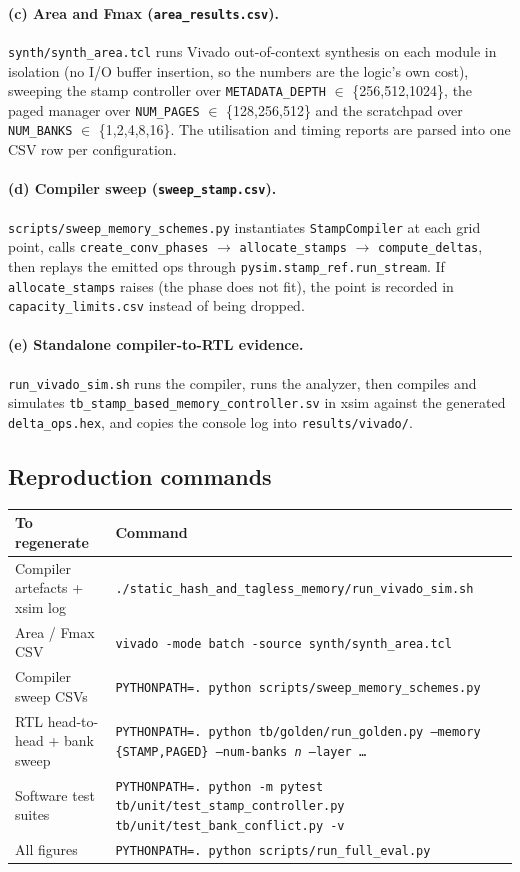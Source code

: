 \documentclass[11pt,a4paper]{article}
\newcommand{\file}[1]{\texttt{\small #1}}
\begin{document}
\paragraph{(c) Area and Fmax (\file{area\_results.csv}).}
\file{synth/synth\_area.tcl} runs Vivado out-of-context synthesis on each module
in isolation (no I/O buffer insertion, so the numbers are the logic's own cost),
sweeping the stamp controller over \file{METADATA\_DEPTH} $\in$ \{256,512,1024\},
the paged manager over \file{NUM\_PAGES} $\in$ \{128,256,512\} and the
scratchpad over \file{NUM\_BANKS} $\in$ \{1,2,4,8,16\}. The utilisation and
timing reports are parsed into one CSV row per configuration.

\paragraph{(d) Compiler sweep (\file{sweep\_stamp.csv}).}
\file{scripts/sweep\_memory\_schemes.py} instantiates \file{StampCompiler} at
each grid point, calls \file{create\_conv\_phases} $\to$
\file{allocate\_stamps} $\to$ \file{compute\_deltas}, then replays the emitted
ops through \file{pysim.stamp\_ref.run\_stream}. If \file{allocate\_stamps}
raises (the phase does not fit), the point is recorded in
\file{capacity\_limits.csv} instead of being dropped.

\paragraph{(e) Standalone compiler-to-RTL evidence.}
\file{run\_vivado\_sim.sh} runs the compiler, runs the analyzer, then compiles
and simulates \file{tb\_stamp\_based\_memory\_controller.sv} in xsim against the
generated \file{delta\_ops.hex}, and copies the console log into
\file{results/vivado/}.

\subsection{Reproduction commands}

\begin{center}
\small
\begin{tabular}{@{}p{5.3cm}p{10.2cm}@{}}
\toprule
\textbf{To regenerate} & \textbf{Command} \\
\midrule
Compiler artefacts + xsim log & \file{./static\_hash\_and\_tagless\_memory/run\_vivado\_sim.sh} \\
Area / Fmax CSV & \file{vivado -mode batch -source synth/synth\_area.tcl} \\
Compiler sweep CSVs & \file{PYTHONPATH=. python scripts/sweep\_memory\_schemes.py} \\
RTL head-to-head + bank sweep & \file{PYTHONPATH=. python tb/golden/run\_golden.py --memory \{STAMP,PAGED\} --num-banks \textit{n} --layer \ldots} \\
Software test suites & \file{PYTHONPATH=. python -m pytest tb/unit/test\_stamp\_controller.py tb/unit/test\_bank\_conflict.py -v} \\
All figures & \file{PYTHONPATH=. python scripts/run\_full\_eval.py} \\
\bottomrule
\end{tabular}
\end{center}
\end{document}
